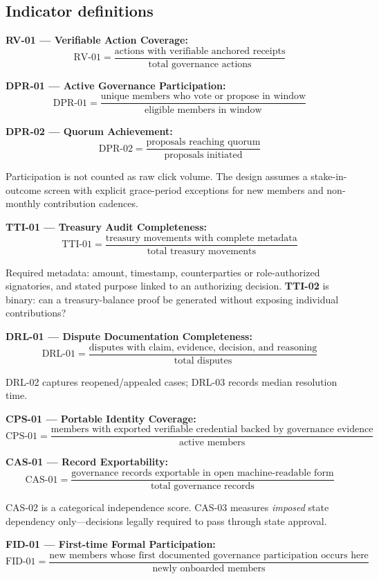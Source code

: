 \documentclass[sigconf,anonymous]{acmart}
\begin{document}
\subsection{Indicator definitions}

\textbf{RV-01 --- Verifiable Action Coverage:}
\[ \text{RV-01} = \frac{\text{actions with verifiable anchored receipts}}{\text{total governance actions}} \]

\textbf{DPR-01 --- Active Governance Participation:}
\[ \text{DPR-01} = \frac{\text{unique members who vote or propose in window}}{\text{eligible members in window}} \]

\textbf{DPR-02 --- Quorum Achievement:}
\[ \text{DPR-02} = \frac{\text{proposals reaching quorum}}{\text{proposals initiated}} \]

Participation is not counted as raw click volume. The design assumes a stake-in-outcome screen with explicit grace-period exceptions for new members and non-monthly contribution cadences.

\textbf{TTI-01 --- Treasury Audit Completeness:}
\[ \text{TTI-01} = \frac{\text{treasury movements with complete metadata}}{\text{total treasury movements}} \]

Required metadata: amount, timestamp, counterparties or role-authorized signatories, and stated purpose linked to an authorizing decision. \textbf{TTI-02} is binary: can a treasury-balance proof be generated without exposing individual contributions?

\textbf{DRL-01 --- Dispute Documentation Completeness:}
\[ \text{DRL-01} = \frac{\text{disputes with claim, evidence, decision, and reasoning}}{\text{total disputes}} \]

DRL-02 captures reopened/appealed cases; DRL-03 records median resolution time.

\textbf{CPS-01 --- Portable Identity Coverage:}
\[ \text{CPS-01} = \frac{\text{members with exported verifiable credential backed by governance evidence}}{\text{active members}} \]

\textbf{CAS-01 --- Record Exportability:}
\[ \text{CAS-01} = \frac{\text{governance records exportable in open machine-readable form}}{\text{total governance records}} \]

CAS-02 is a categorical independence score. CAS-03 measures \textit{imposed} state dependency only---decisions legally required to pass through state approval.

\textbf{FID-01 --- First-time Formal Participation:}
\[ \text{FID-01} = \frac{\text{new members whose first documented governance participation occurs here}}{\text{newly onboarded members}} \]
\end{document}

